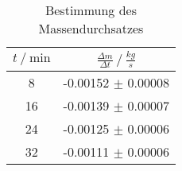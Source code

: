 \begin{table}
        \centering
        \label{tab:massendurchsatz2}
        \begin{tabular}{c c}
        \toprule
        $t \mathbin{/} \si{\minute} $ & $\frac{\Delta m}{\Delta t} \mathbin{/} \si{\frac{kg}{s}}$  \\
        \midrule
        8  & -0.00152 $\pm$ 0.00008 \\
        16 & -0.00139 $\pm$ 0.00007 \\
        24 & -0.00125 $\pm$ 0.00006 \\
        32 & -0.00111 $\pm$ 0.00006 \\
        \bottomrule
        \end{tabular}
        \caption{Bestimmung des Massendurchsatzes}
        \end{table}